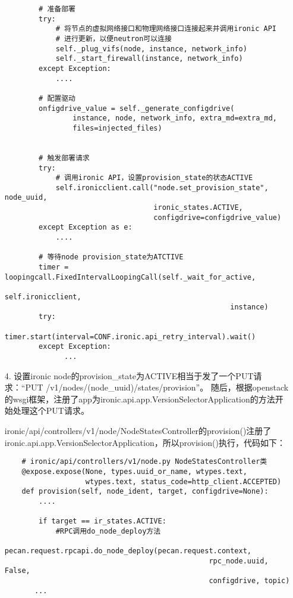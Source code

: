 \documentclass[a4paper,left=2.5cm,right=2.5cm,11pt]{article}
\begin{document}
\begin{itemize}
\begin{lstlisting}
        # 准备部署
        try:
            # 将节点的虚拟网络接口和物理网络接口连接起来并调用ironic API
            # 进行更新，以便neutron可以连接
            self._plug_vifs(node, instance, network_info)
            self._start_firewall(instance, network_info)
        except Exception:
            ....

        # 配置驱动
        onfigdrive_value = self._generate_configdrive(
                instance, node, network_info, extra_md=extra_md,
                files=injected_files)


        # 触发部署请求
        try:
            # 调用ironic API，设置provision_state的状态ACTIVE
            self.ironicclient.call("node.set_provision_state", node_uuid,
                                   ironic_states.ACTIVE,
                                   configdrive=configdrive_value)
        except Exception as e:
            ....

        # 等待node provision_state为ATCTIVE
        timer = loopingcall.FixedIntervalLoopingCall(self._wait_for_active,
                                                     self.ironicclient,
                                                     instance)
        try:
            timer.start(interval=CONF.ironic.api_retry_interval).wait()
        except Exception:
              ...
		\end{lstlisting}

		\item[4.] 设置ironic node的provision\_state为ACTIVE相当于发了一个PUT请求：“PUT /v1/nodes/(node\_uuid)/states/provision”。
		随后，根据openstack的wsgi框架，注册了app为ironic.api.app.VersionSelectorApplication的方法开始处理这个PUT请求。\par

		ironic/api/controllers/v1/node/NodeStatesController的provision()注册了ironic.api.app.VersionSelectorApplication，所以provision()执行，代码如下：
		\begin{lstlisting}
	# ironic/api/controllers/v1/node.py NodeStatesController类
	@expose.expose(None, types.uuid_or_name, wtypes.text,
                   wtypes.text, status_code=http_client.ACCEPTED)
    def provision(self, node_ident, target, configdrive=None):
        ....

        if target == ir_states.ACTIVE:
            #RPC调用do_node_deploy方法
            pecan.request.rpcapi.do_node_deploy(pecan.request.context,
                                                rpc_node.uuid, False,
                                                configdrive, topic)
       ...
		\end{lstlisting}


\end{itemize}
\end{document}
